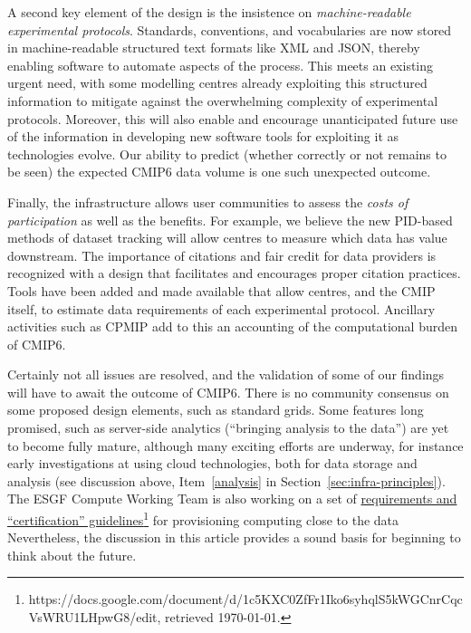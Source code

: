 \documentclass[gmd,manuscript]{copernicus}
\begin{document}
A second key element of the design is the insistence on
\emph{machine-readable experimental protocols}. Standards,
conventions, and vocabularies are now stored in machine-readable
structured text formats like XML and JSON, thereby enabling software
to automate aspects of the process. This meets an existing urgent
need, with some modelling centres already exploiting this structured
information to mitigate against the overwhelming complexity of
experimental protocols. Moreover, this will also enable and encourage
unanticipated future use of the information in developing new software
tools for exploiting it as technologies evolve. Our ability to predict
(whether correctly or not remains to be seen) the expected CMIP6 data
volume is one such unexpected outcome.

Finally, the infrastructure allows user communities to assess the
\emph{costs of participation} as well as the benefits. For example, we
believe the new PID-based methods of dataset tracking will allow
centres to measure which data has value downstream. The importance of
citations and fair credit for data providers is recognized with a
design that facilitates and encourages proper citation practices.
Tools have been added and made available that allow centres, and the
CMIP itself, to estimate data requirements of each experimental
protocol. Ancillary activities such as CPMIP add to this an accounting
of the computational burden of CMIP6.

Certainly not all issues are resolved, and the validation of some of
our findings will have to await the outcome of CMIP6. There is no
community consensus on some proposed design elements, such as standard
grids. Some features long promised, such as server-side analytics
(``bringing analysis to the data'') are yet to become fully mature,
although many exciting efforts are underway, for instance early
investigations at using cloud technologies, both for data storage and
analysis (see discussion above, Item~\ref{analysis} in
Section~\ref{sec:infra-principles}). The ESGF Compute Working Team is
also working on a set of
\href{https://docs.google.com/document/d/1c5KXC0ZfFr1Iko6syhqlS5kWGCnrCqcVsWRU1LHpwG8/edit}{requirements
  and ``certification''
  guidelines}\footnote{https://docs.google.com/document/d/1c5KXC0ZfFr1Iko6syhqlS5kWGCnrCqcVsWRU1LHpwG8/edit,
  retrieved \today.} for provisioning computing close to the data
Nevertheless, the discussion in this article provides a sound basis
for beginning to think about the future.
\end{document}
